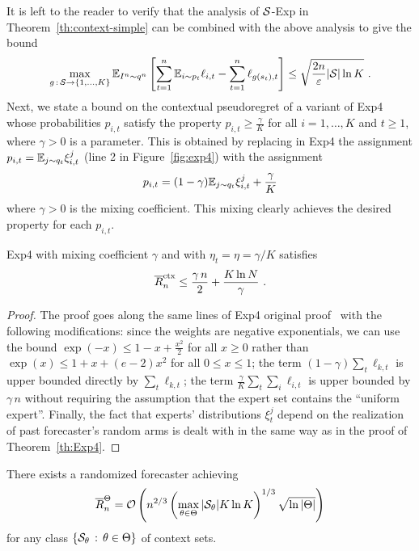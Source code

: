 %
It is left to the reader to verify that the analysis of $\mathcal{S}$-Exp in Theorem~\ref{th:context-simple} can be combined with the above analysis to give the bound
\begin{equation}
\label{eq:exp3-rebel-cont}
    \max_{g \,:\, \mathcal{S}\to\{1,\dots,K\}} \mathbb{E}_{I^n \sim q^n} \left[ \sum_{t=1}^n \mathbb{E}_{i \sim p_t} \ell_{i,t} - \sum_{t=1}^n \ell_{g(s_t),t} \right] \le
    \sqrt{\frac{2 n}{\varepsilon}|\mathcal{S}|\ln K}~.
\end{equation}
%
Next, we state a bound on the contextual pseudoregret of a variant of Exp4 whose probabilities $p_{i,t}$ satisfy the property $p_{i,t} \ge \tfrac{\gamma}{K}$ for all $i=1,\dots,K$ and $t \ge 1$, where $\gamma > 0$ is a parameter. This is obtained by replacing in Exp4 the assignment $p_{i,t} = \mathbb{E}_{j \sim q_t} \xi_{i,t}^j$ (line 2 in Figure~\ref{fig:exp4}) with the assignment
\[
	p_{i,t} = (1-\gamma)\mathbb{E}_{j \sim q_t} \xi_{i,t}^j + \frac{\gamma}{K}
\]
where $\gamma > 0$ is the mixing coefficient. This mixing clearly achieves the desired property for each $p_{i,t}$.
%
\begin{theorem}
\label{th:exp4-mixing}
Exp4 with mixing coefficient $\gamma$ and with $\eta_t = \eta = \gamma/K$ satisfies
\begin{equation}
\label{eq:exp4bound-mix}
	\overline{R}^{\mathrm{ctx}}_n \le \frac{\gamma\,n}{2} + \frac{K\ln N}{\gamma}~.
\end{equation}
\end{theorem}
%
\begin{proof}
The proof goes along the same lines of Exp4 original proof~\cite[Theorem~7.1]{ACFS03} with the following modifications: since the weights are negative exponentials, we can use the bound $\exp(-x) \le 1 - x + \tfrac{x^2}{2}$ for all $x \ge 0$ rather than $\exp(x) \le 1 + x + (e-2)x^2$ for all $0 \le x \le 1$; the term $(1-\gamma)\sum_t\ell_{k,t}$ is upper bounded directly by $\sum_t\ell_{k,t}$; the term $\tfrac{\gamma}{K}\sum_t\sum_i \ell_{i,t}$ is upper bounded by $\gamma\,n$ without requiring the assumption that the expert set contains the ``uniform expert''. Finally, the fact that experts' distributions $\xi_t^j$ depend on the realization of past forecaster's random arms is dealt with in the same way as in the proof of Theorem~\ref{th:Exp4}.
\end{proof}
%
\begin{theorem}
\label{th:theta-regret}
There exists a randomized forecaster achieving
\[
	\overline{R}^{\Theta}_n = \mathcal{O}\left(n^{2/3}\left(\max_{\theta\in\Theta}|\mathcal{S}_{\theta}|K\ln K\right)^{1/3}\sqrt{\ln|\Theta|}\right)
\]
for any class $\left\{{\mathcal{S}_{\theta}}\,:\,{\theta\in\Theta}\right\}$ of context sets.
\end{theorem}
